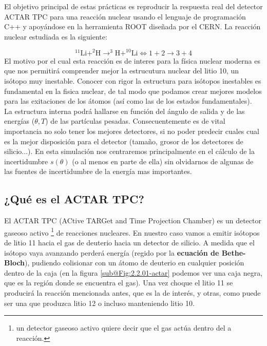 \documentclass[12pt,a4paper]{article}
\numberwithin{equation}{section}
\numberwithin{figure}{section}
\begin{document}
El objetivo principal de estas prácticas es reproducir la respuesta real del detector ACTAR TPC para una reacción nuclear usando el lenguaje de programación C++ y apoyándose en la herramienta ROOT diseñada por el CERN. La reacción nuclear estudiada es la siguiente:

\begin{equation}
    ^{11}\mathrm{Li}+^2\mathrm{H} \rightarrow ^3\mathrm{H}+^{10}\mathrm{Li} \Longleftrightarrow 1 + 2 \rightarrow 3 + 4
\end{equation}
El motivo por el cual esta reacción es de interes para la física nuclear moderna es que nos permitirá comprender mejor la estrucutura nuclear del litio 10, un isótopo muy inestable. Conocer con rigor la estructura para isótopos inestables es fundamental en la fisica nuclear, de tal modo que podamos crear mejores modelos para las exitaciones de los átomos (así como las de los estados fundamentales).  \\

La estructura interna podrá hallarse en función del ángulo de salida y de las energías ($\theta, T$) de las partículas pesadas. Consecuentemente es de vital importancia no solo tener los mejores detectores, si no poder predecir cuales cual es la mejor disposición para el detector (tamaño, grosor de los detectores de silicio...). En esta simulación nos centraremos principalmente en el cálculo de la incertidumbre $s(\theta)$ (o al menos en parte de ella) sin olvidarnos de algunas de las fuentes de incertidumbre de la energía mas importantes.
\subsection{¿Qué es el ACTAR TPC?}

El ACTAR TPC (ACtive TARGet and Time Projection Chamber) es un detector gaseoso activo \footnote{un detector gaseoso activo quiere decir que el gas actúa dentro del a reacción.} de reacciones nucleares. En nuestro caso vamos a emitir isótopos de litio 11 hacia el gas de deuterio hacia un detector de silicio. A medida que el isótopo vaya avanzando perderá energía (regido por la {\bf ecuación de Bethe-Bloch}), pudiendo colisionar con un átomo de deuterio en cualquier posición dentro de la caja (en la figura \ref{sub@Fig:2.2.01-actar} podemos ver una caja negra, que es la región donde se encuentra el gas). Una vez choque el litio 11 se producirá la reacción mencionada antes, que es la de interés, y otras, como puede ser una que produzca litio 12 o incluso manteniendo litio 10.    \\
\end{document}
